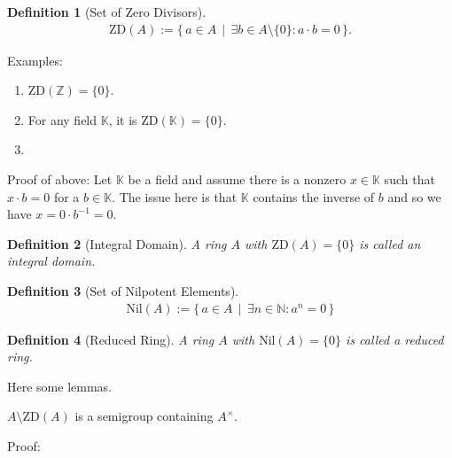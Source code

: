 \documentclass{book}
\theoremstyle{custom_definition}
\newtheorem{definition}{Definition}
\theoremstyle{custom_theorem}
\begin{document}
    \begin{definition}[Set of Zero Divisors]
        \begin{align}
            \text{ZD}(A) := \{\, a \in A \,\mid\, \exists b \in A \setminus \{0\} : a \cdot b = 0 \,\}.
        \end{align}
    \end{definition}

    Examples:
    \begin{enumerate}
        \item \(\text{ZD}(\mathbb{Z}) = \{0\}\).
        \item For any field \(\mathbb{K}\), it is \(\text{ZD}(\mathbb{K}) = \{0\}\).
        \item 
    \end{enumerate}

    Proof of above:
    Let \(\mathbb{K}\) be a field and assume there is a nonzero \(x \in \mathbb{K}\) such that \(x \cdot b = 0\) for a \(b \in \mathbb{K}\). The issue here is that \(\mathbb{K}\) contains the inverse of \(b\) and so we have \(x = 0 \cdot b^{-1} = 0\).

    \begin{definition}[Integral Domain]
        A ring \(A\) with \(\text{ZD}(A) = \{0\}\) is called an integral domain.
    \end{definition}

    \begin{definition}[Set of Nilpotent Elements]
        \begin{align}
            \text{Nil}(A) := \{\, a \in A \,\mid\, \exists n \in \mathbb{N} : a^n = 0 \,\}
        \end{align}
    \end{definition}

    \begin{definition}[Reduced Ring]
        A ring \(A\) with \(\text{Nil}(A) = \{0\}\) is called a reduced ring.
    \end{definition}


    Here some lemmas.

    \(A \setminus \text{ZD}(A)\) is a semigroup containing \(A^\times\).

    Proof:
\end{document}
